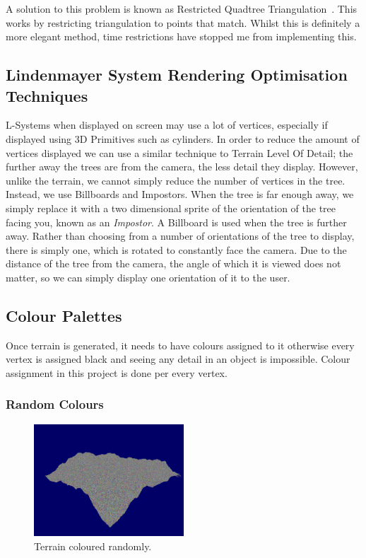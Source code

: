\documentclass[a4paper,10pt]{report}
\begin{document}
A solution to this problem is known as Restricted Quadtree Triangulation~\cite{pajarola1998large}. This works by restricting triangulation to points that match. Whilst this is definitely a more elegant method, time restrictions have stopped me from implementing this. 

\subsection{Lindenmayer System Rendering Optimisation Techniques}
L-Systems when displayed on screen may use a lot of vertices, especially if displayed using 3D Primitives such as cylinders. In order to reduce the amount of vertices displayed we can use a similar technique to Terrain Level Of Detail; the further away the trees are from the camera, the less detail they display. However, unlike the terrain, we cannot simply reduce the number of vertices in the tree. Instead, we use Billboards and Impostors. When the tree is far enough away, we simply replace it with a two dimensional sprite of the orientation of the tree facing you, known as an \textit{Impostor}. A Billboard is used when the tree is further away. Rather than choosing from a number of orientations of the tree to display, there is simply one, which is rotated to constantly face the camera. Due to the distance of the tree from the camera, the angle of which it is viewed does not matter, so we can simply display one orientation of it to the user.

\clearpage
\subsection{Colour Palettes}
Once terrain is generated, it needs to have colours assigned to it otherwise every vertex is assigned black and seeing any detail in an object is impossible. Colour assignment in this project is done per every vertex.

\subsubsection{Random Colours}
\begin{figure}[ht!]
    \centering
  \includegraphics[width=0.5\textwidth]{Images/Screenshots/palette-r.png}
 \caption{Terrain coloured randomly.}
 \label{fig:palette-r}
\end{figure}
\end{document}
